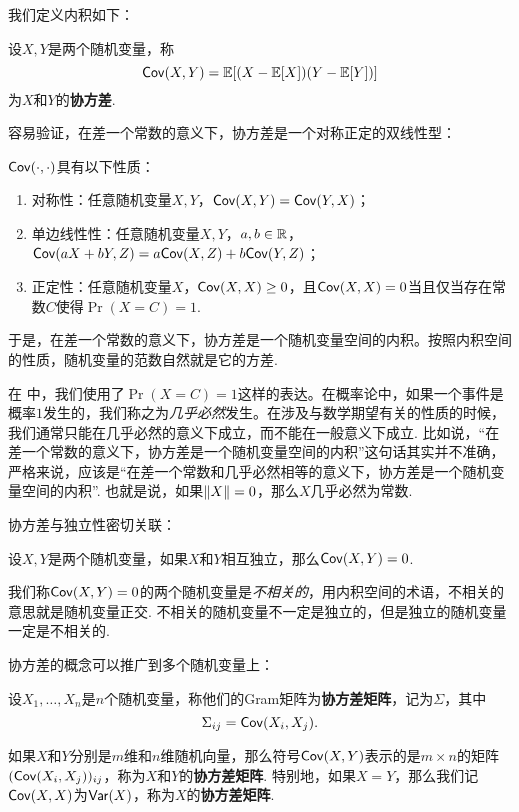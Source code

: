我们定义内积如下：

\begin{definition}[协方差] 
设$X,Y$是两个随机变量，称
\[\mathsf{Cov}(X,Y)=\mathbb{E}[(X-\mathbb{E}[X])(Y-\mathbb{E}[Y])]\]
为$X$和$Y$的\textbf{协方差}. 
\end{definition}

容易验证，在差一个常数的意义下，协方差是一个对称正定的双线性型：

\begin{proposition}\label{prop:covariance-inner-product}
$\mathsf{Cov}(\cdot,\cdot)$具有以下性质：
\begin{enumerate}
    \item 对称性：任意随机变量$X,Y$，$\mathsf{Cov}(X,Y)=\mathsf{Cov}(Y,X)$；
    \item 单边线性性：任意随机变量$X,Y$，$a,b\in\mathbb{R}$，$\mathsf{Cov}(aX+bY,Z)=a\mathsf{Cov}(X,Z)+b\mathsf{Cov}(Y,Z)$；
    \item 正定性：任意随机变量$X$，$\mathsf{Cov}(X,X)\geq 0$，且$\mathsf{Cov}(X,X)=0$当且仅当存在常数$C$使得$\Pr(X=C)=1$.
\end{enumerate}
\end{proposition}

于是，在差一个常数的意义下，协方差是一个随机变量空间的内积。按照内积空间的性质，随机变量的范数自然就是它的方差. 

\begin{remark}
    在 中，我们使用了$\Pr(X=C)=1$这样的表达。在概率论中，如果一个事件是概率$1$发生的，我们称之为\emph{几乎必然}发生。在涉及与数学期望有关的性质的时候，我们通常只能在几乎必然的意义下成立，而不能在一般意义下成立. 比如说，“在差一个常数的意义下，协方差是一个随机变量空间的内积”这句话其实并不准确，严格来说，应该是“在差一个常数和几乎必然相等的意义下，协方差是一个随机变量空间的内积”. 也就是说，如果$\left\|X\right\|=0$，那么$X$几乎必然为常数.
\end{remark}

协方差与独立性密切关联：

\begin{proposition}\label{prop:independent-covariance}
设$X,Y$是两个随机变量，如果$X$和$Y$相互独立，那么$\mathsf{Cov}(X,Y)=0$.
\end{proposition}

我们称$\mathsf{Cov}(X,Y)=0$的两个随机变量是\emph{不相关的}，用内积空间的术语，不相关的意思就是随机变量正交. 不相关的随机变量不一定是独立的，但是独立的随机变量一定是不相关的. 

协方差的概念可以推广到多个随机变量上：

\begin{definition}[协方差矩阵]
设$X_1,\dots,X_n$是$n$个随机变量，称他们的Gram矩阵为\textbf{协方差矩阵}，记为$\Sigma$，其中
\[\Sigma_{ij}=\mathsf{Cov}(X_i,X_j).\]

如果$X$和$Y$分别是$m$维和$n$维随机向量，那么符号$\mathsf{Cov}(X,Y)$表示的是$m\times n$的矩阵$(\mathsf{Cov}(X_i,X_j))_{ij}$，称为$X$和$Y$的\textbf{协方差矩阵}. 特别地，如果$X=Y$，那么我们记$\mathsf{Cov}(X,X)$为$\mathsf{Var}(X)$，称为$X$的\textbf{协方差矩阵}. 
\end{definition}

